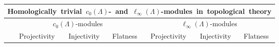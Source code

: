 \begin{scriptsize}
\begin{longtable}{|c|c|c|c|c|c|c|}
\multicolumn{7}{c}{\mbox{Homologically trivial $c_0(\Lambda)$- and $\ell_\infty(\Lambda)$-modules in topological theory}}                                                                                                                                                                                                                                                                                                                                                                                                                                                                                                                                                                                                                                \\
					 
\hline                 & \multicolumn{3}{c|}{$c_0(\Lambda)$-modules}                                                                                                                                                                                                                                                                                                                     & \multicolumn{3}{c|}{$\ell_\infty(\Lambda)$-modules}                                                                                                                                                                                                                                                                                                        \\
\hline
                       & \mbox{Projectivity}                                                                                                 & \mbox{Injectivity}                                                                                                  & \mbox{Flatness}                                                                                                     & \mbox{Projectivity}                                                                                                 & \mbox{Injectivity}                                                                                                  & \mbox{Flatness}                                                                                                     \\ 
\hline

\end{longtable}
\end{scriptsize}

